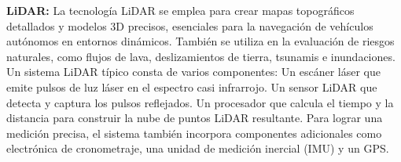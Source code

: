 \textbf{LiDAR:}
La tecnología LiDAR se emplea para crear mapas topográficos detallados y modelos 3D precisos, esenciales para la navegación de vehículos autónomos en entornos dinámicos. También se utiliza en la evaluación de riesgos naturales, como flujos de lava, deslizamientos de tierra, tsunamis e inundaciones.
Un sistema LiDAR típico consta de varios componentes:
Un escáner láser que emite pulsos de luz láser en el espectro casi infrarrojo.
Un sensor LiDAR que detecta y captura los pulsos reflejados.
Un procesador que calcula el tiempo y la distancia para construir la nube de puntos LiDAR resultante.
Para lograr una medición precisa, el sistema también incorpora componentes adicionales como electrónica de cronometraje, una unidad de medición inercial (IMU) y un GPS.
